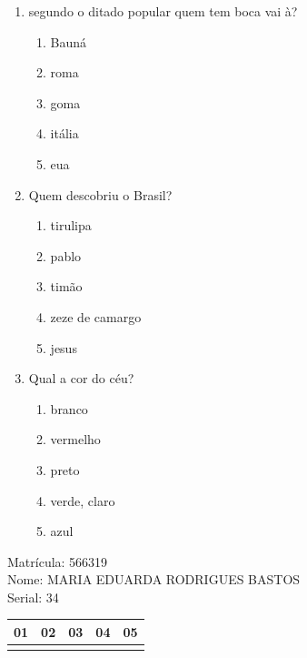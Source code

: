 \documentclass[10pt,a4paper,twocolumn]{report}
\begin{document}
 \begin{enumerate} 
    \item  segundo o ditado popular quem tem boca vai à?





    \begin{enumerate}
    \item  Bauná

\item  roma

\item  goma

\item  itália

\item  eua


    \end{enumerate} 
    \item  Quem descobriu o Brasil?





    \begin{enumerate}
    \item  tirulipa

\item  pablo

\item  timão

\item  zeze de camargo

\item  jesus


    \end{enumerate} 
    \item  Qual a cor do céu?





    \begin{enumerate}
    \item  branco

\item  vermelho

\item  preto

\item  verde, claro

\item  azul


    \end{enumerate}\end{enumerate} 
Matrícula: 566319\\ Nome: MARIA EDUARDA RODRIGUES BASTOS \\ Serial: 34\\
\begin{tabular}{|l|l|l|l|l|}\hline
01  &02  &03  &04  &05 \\ \hline 
 & & & & \\ \hline 
\end{tabular}
 \cleardoublepage 
\end{document}
